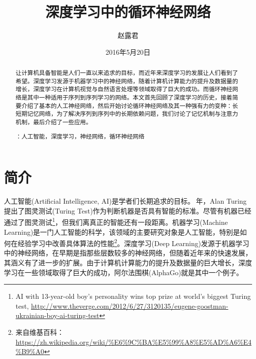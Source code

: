 \documentclass[12pt,a4paper]{article}
\begin{document}
\title{\hei 深度学习中的循环神经网络}
\author{\FZzdx 赵露君}
\date{\kai 2016年5月20日}

\maketitle

\begin{abstract}
\quad\kai 让计算机具备智能是人们一直以来追求的目标，而近年来深度学习的发展让人们看到了希望。深度学习发源于机器学习中的神经网络，随着计算机计算能力的提升及数据量的增长，深度学习在计算机视觉与自然语言处理等领域取得了巨大的成功。而循环神经网络是其中一种适用于序列到序列学习的网络。本文首先回顾了深度学习的历史，接着简要介绍了基本的人工神经网络，然后开始讨论循环神经网络及其一种强有力的变种：长短期记忆网络，为了解决序列到序列中的长期依赖问题，我们讨论了记忆机制与注意力机制，最后介绍了一些应用。

\smallskip
{}：人工智能，深度学习，神经网络，循环神经网络
\end{abstract}

\section{简介}

{\hei 人工智能}({\crimson Artificial Intelligence, AI})是学者们长期追求的目标。{}$\:$年，{\crimson Alan Turing} 提出了{\hei 图灵测试}({\crimson Turing Test}){\kai \cite{turing1950computing}}作为判断机器是否具有智能的标准。尽管有机器已经通过了图灵测试\footnote{\crimson AI with 13-year-old boy's personality wins top prize at world's biggest Turing test, \url{http://www.theverge.com/2012/6/27/3120135/eugene-goostman-ukrainian-boy-ai-turing-test}}，但我们离真正的智能还有一段距离。{\hei 机器学习}({\crimson Machine Learning})是一门人工智能的科学，该领域的主要研究对象是人工智能，特别是如何在经验学习中改善具体算法的性能\footnote{\hei 来自维基百科：\url{https://zh.wikipedia.org/wiki/\%E6\%9C\%BA\%E5\%99\%A8\%E5\%AD\%A6\%E4\%B9\%A0}}。{\hei 深度学习}({\crimson Deep Learning}){\kai \cite{lecun2015deep,Goodfellow2016Book}}发源于机器学习中的神经网络，在早期是指那些层数较多的神经网络，但随着近年来的快速发展，其涵义有了进一步的扩展。由于计算机计算能力的提升及数据量的巨大增长，深度学习在一些领域取得了巨大的成功，{\hei 阿尔法围棋}({\crimson AlphaGo}){\kai \cite{silver2016mastering}}就是其中一个例子。
\end{document}
